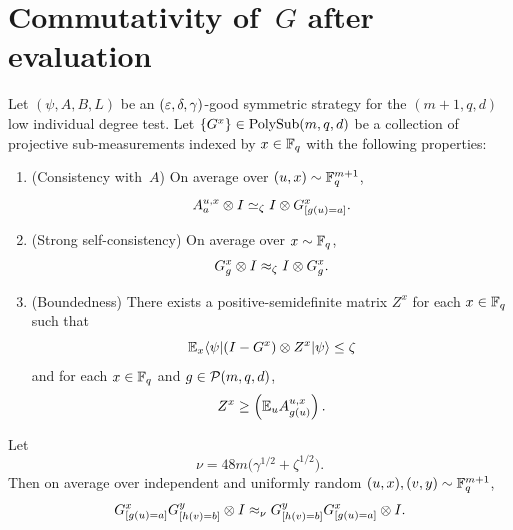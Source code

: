 \section{Commutativity of~$G$ after evaluation}
\label{sec:G-commutes-after-evaluation}

\begin{lemma}\label{lem:comm-data-processed-g}
	\leanok
	Let $(\psi,A,B,L)$ be an $(\varepsilon,\delta,\gamma)$-good symmetric strategy for the $(m+1,q,d)$ low individual degree test.
	Let $\{G^x\} \in \mathrm{PolySub}(m,q,d)$ be a collection of projective sub-measurements indexed by $x \in \mathbb{F}_q$ with the following properties:
	\begin{enumerate}
		\item (Consistency with~$A$)\label{item:data-processed-consistency}
		      On average over $(u,x) \sim \mathbb{F}_q^{m+1}$,
		      \[
			      A_a^{u,x} \otimes I \simeq_\zeta I \otimes G^x_{[g(u)=a]}.
		      \]
		\item (Strong self-consistency)\label{item:data-processed-self-consistency}
		      On average over $x \sim \mathbb{F}_q$,
		      \[
			      G_g^x \otimes I \approx_\zeta I \otimes G_g^x.
		      \]
		\item (Boundedness)\label{item:data-processed-boundedness}
		      There exists a positive-semidefinite matrix $Z^x$ for each $x \in \mathbb{F}_q$ such that
		      \[
			      \mathbb{E}_x \langle \psi \rvert (I-G^x) \otimes Z^x \lvert \psi \rangle \le \zeta
		      \]
		      and for each $x \in \mathbb{F}_q$ and $g \in \mathcal{P}(m,q,d)$,
		      \[
			      Z^x \ge \left(\mathbb{E}_u A_{g(u)}^{u,x}\right).
		      \]
	\end{enumerate}
	Let
	\[
		\nu = 48m\bigl(\gamma^{1/2}+\zeta^{1/2}\bigr).
	\]
	Then on average over independent and uniformly random $(u,x),(v,y) \sim \mathbb{F}_q^{m+1}$,
	\[
		G^x_{[g(u)=a]} G^y_{[h(v)=b]} \otimes I \approx_\nu G^y_{[h(v)=b]} G^x_{[g(u)=a]} \otimes I.
	\]
\end{lemma}

